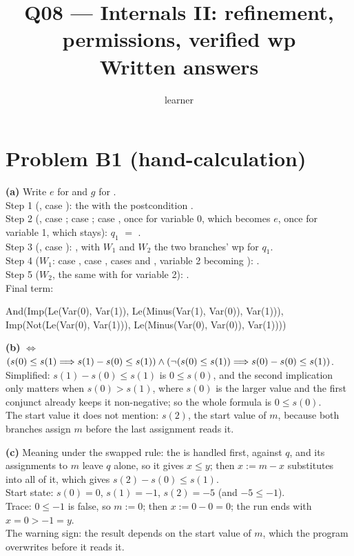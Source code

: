 \documentclass[11pt]{article}
\title{Q08 --- Internals II: refinement, permissions, verified wp \\ \large Written answers}
\author{learner}
\date{}
\begin{document}
\maketitle

\section*{Problem B1 (hand-calculation)}\label{ans:B1}
\begin{answer}
\textbf{(a)} Write $e$ for  and $g$ for
. \\
Step 1 (, case ): the  with the postcondition
. \\
Step 2 (, case ;  case ; 
case , once for variable 0, which becomes $e$, once for variable 1,
which stays): $q_1$ $=$ . \\
Step 3 (, case ): , with
$W_1$ and $W_2$ the two branches' wp for $q_1$. \\
Step 4 ($W_1$:  case ,  case ,
 cases  and , variable 2 becoming
): . \\
Step 5 ($W_2$, the same with  for variable 2):
. \\
Final term:
\begin{dafnycode}
And(Imp(Le(Var(0), Var(1)), Le(Minus(Var(1), Var(0)), Var(1))),
    Imp(Not(Le(Var(0), Var(1))), Le(Minus(Var(0), Var(0)), Var(1))))
\end{dafnycode}

\textbf{(b)}  $\iff$ $(s(0) \leq s(1) \Longrightarrow s(1)
- s(0) \leq s(1)) \wedge (\neg(s(0) \leq s(1)) \Longrightarrow s(0) - s(0) \leq s(1))$. \\
Simplified: $s(1) - s(0) \leq s(1)$ is $0 \leq s(0)$, and the second
implication only matters when $s(0) > s(1)$, where $s(0)$ is the larger value
and the first conjunct already keeps it non-negative; so the whole formula is
$0 \leq s(0)$. \\
The start value it does not mention: $s(2)$, the start value of $m$, because
both branches assign $m$ before the last assignment reads it.

\textbf{(c)} Meaning under the swapped rule: the  is handled first,
against $q$, and its assignments to $m$ leave $q$ alone, so it gives $x \leq
y$; then $x := m - x$ substitutes into all of it, which gives $s(2) - s(0)
\leq s(1)$. \\
Start state: $s(0) = 0$, $s(1) = -1$, $s(2) = -5$ (and $-5 \leq -1$). \\
Trace: $0 \leq -1$ is false, so $m := 0$; then $x := 0 - 0 = 0$; the run ends
with $x = 0 > -1 = y$. \\
The warning sign: the result depends on the start value of $m$, which the
program overwrites before it reads it.
\end{answer}
\end{document}
